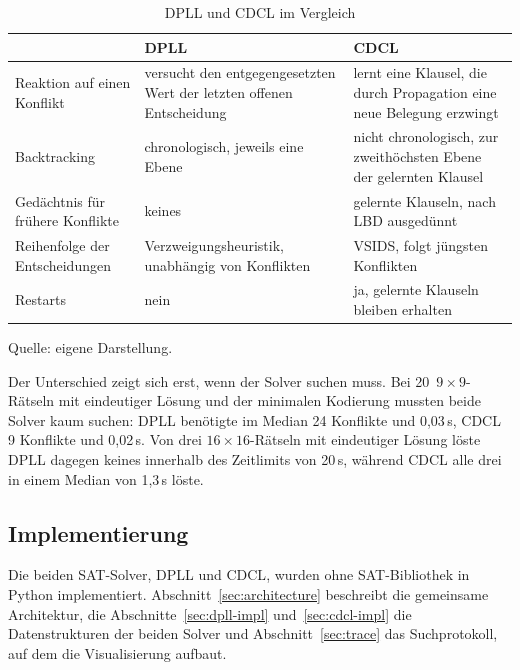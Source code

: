 \begin{table}[htb]
    \centering
    \caption{DPLL und \acs{CDCL} im Vergleich}
    \label{tab:dpll-vs-cdcl}
    \small
    \renewcommand{\arraystretch}{1.3}
    \begin{tabularx}{\textwidth}{@{}>{\raggedright\arraybackslash}p{3.6cm} >{\raggedright\arraybackslash}X >{\raggedright\arraybackslash}X@{}}
        \toprule
         & DPLL & \acs{CDCL} \\
        \midrule
        Reaktion auf einen Konflikt
            & versucht den entgegengesetzten Wert der letzten offenen Entscheidung
            & lernt eine Klausel, die durch Propagation eine neue Belegung erzwingt \\
        Backtracking
            & chronologisch, jeweils eine Ebene
            & nicht chronologisch, zur zweithöchsten Ebene der gelernten Klausel \\
        Gedächtnis für frühere Konflikte
            & keines
            & gelernte Klauseln, nach \acs{LBD} ausgedünnt \\
        Reihenfolge der Entscheidungen
            & Verzweigungsheuristik, unabhängig von Konflikten
            & \leavevmode\acs{VSIDS}, folgt jüngsten Konflikten \\
        Restarts
            & nein
            & ja, gelernte Klauseln bleiben erhalten \\
        \bottomrule
    \end{tabularx}
    \par\smallskip
    {\footnotesize Quelle: eigene Darstellung.}
\end{table}

Der Unterschied zeigt sich erst, wenn der Solver suchen muss.
Bei 20~$9 \times 9$-Rätseln mit eindeutiger Lösung und der minimalen Kodierung mussten beide Solver kaum suchen: DPLL benötigte im Median 24 Konflikte und 0,03\,s, \acs{CDCL} 9 Konflikte und 0,02\,s.
Von drei $16 \times 16$-Rätseln mit eindeutiger Lösung löste DPLL dagegen keines innerhalb des Zeitlimits von 20\,s, während \acs{CDCL} alle drei in einem Median von 1,3\,s löste.

\subsection{Implementierung} \label{sec:implementation}

Die beiden \acs{SAT}-Solver, DPLL und \acs{CDCL}, wurden ohne \acs{SAT}-Bibliothek in Python implementiert.
Abschnitt~\ref{sec:architecture} beschreibt die gemeinsame Architektur, die Abschnitte~\ref{sec:dpll-impl} und~\ref{sec:cdcl-impl} die Datenstrukturen der beiden Solver und Abschnitt~\ref{sec:trace} das Suchprotokoll, auf dem die Visualisierung aufbaut.


